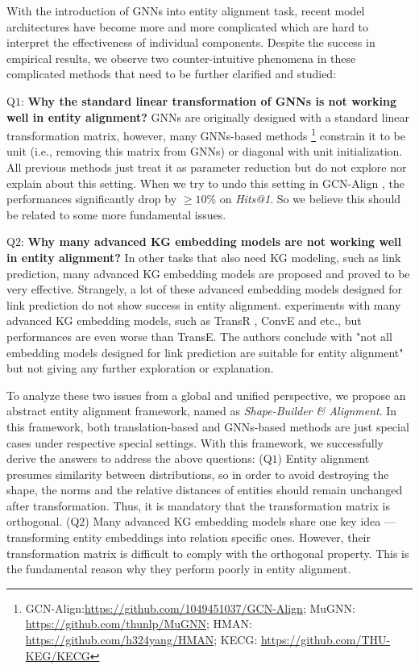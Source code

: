 \documentclass[sigconf,camera-ready]{acmart}
\begin{document}
With the introduction of GNNs into entity alignment task, recent model architectures have become more and more complicated which are hard to interpret the effectiveness of individual components.
Despite the success in empirical results, we observe two counter-intuitive phenomena in these complicated methods that need to be further clarified and studied:

Q$1$: \textbf{Why the standard linear transformation of GNNs is not working well in entity alignment?}
GNNs are originally designed with a standard linear transformation matrix,
however, many GNNs-based methods \cite{DBLP:conf/emnlp/WangLLZ18,DBLP:conf/acl/CaoLLLLC19,li-etal-2019-semi,yang2019aligning}\footnote{GCN-Align:\url{https://github.com/1049451037/GCN-Align}; MuGNN: \url{https://github.com/thunlp/MuGNN}; HMAN: \url{https://github.com/h324yang/HMAN}; KECG: \url{https://github.com/THU-KEG/KECG}}
constrain it to be unit (i.e., removing this matrix from GNNs) or diagonal with unit initialization.
All previous methods just treat it as parameter reduction but do not explore nor explain about this setting.
When we try to undo this setting in GCN-Align \cite{DBLP:conf/emnlp/WangLLZ18}, the performances significantly drop by $\geqslant10\%$ on \emph{Hits@1}.
So we believe this should be related to some more fundamental issues.

Q$2$: \textbf{Why many advanced KG embedding models are not working well in entity alignment?}
In other tasks that also need KG modeling, such as link prediction, many advanced KG embedding models are proposed and proved to be very effective.
Strangely, a lot of these advanced embedding models designed for link prediction do not show success in entity alignment.
\citet{DBLP:conf/semweb/SunHHCGQ19} experiments with many advanced KG embedding models, such as TransR \cite{DBLP:conf/aaai/LinLSLZ15}, ConvE \cite{DBLP:conf/aaai/DettmersMS018} and etc., but performances are even worse than TransE.
The authors conclude with "not all embedding models designed for link prediction are suitable for entity alignment" but not giving any further exploration or explanation.

To analyze these two issues from a global and unified perspective, we propose an abstract entity alignment framework, named as \emph{Shape-Builder \& Alignment}.
In this framework, both translation-based and GNNs-based methods are just special cases under respective special settings.
With this framework, we successfully derive the answers to address the above questions:
(Q$1$) Entity alignment presumes similarity between distributions, so in order to avoid destroying the shape, the norms and the relative distances of entities should remain unchanged after transformation.
Thus, it is mandatory that the transformation matrix is orthogonal.
(Q$2$) Many advanced KG embedding models share one key idea --- transforming  entity embeddings into relation specific ones.
However, their transformation matrix is difficult to comply with the orthogonal property.
This is the fundamental reason why they perform poorly in entity alignment.
\end{document}
